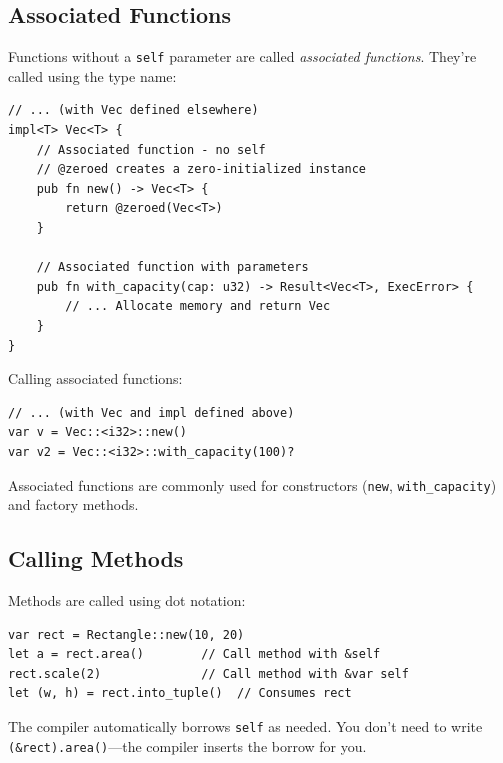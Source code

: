 \subsection{Associated Functions}
\label{subsec:associated-functions}

Functions without a \texttt{self} parameter are called \emph{associated functions}. They're called using the type name:

\begin{lstlisting}
// ... (with Vec defined elsewhere)
impl<T> Vec<T> {
    // Associated function - no self
    // @zeroed creates a zero-initialized instance
    pub fn new() -> Vec<T> {
        return @zeroed(Vec<T>)
    }

    // Associated function with parameters
    pub fn with_capacity(cap: u32) -> Result<Vec<T>, ExecError> {
        // ... Allocate memory and return Vec
    }
}
\end{lstlisting}

Calling associated functions:

\begin{lstlisting}
// ... (with Vec and impl defined above)
var v = Vec::<i32>::new()
var v2 = Vec::<i32>::with_capacity(100)?
\end{lstlisting}

Associated functions are commonly used for constructors (\texttt{new}, \texttt{with\_capacity}) and factory methods.

\subsection{Calling Methods}
\label{subsec:calling-methods}

Methods are called using dot notation:

\begin{lstlisting}
var rect = Rectangle::new(10, 20)
let a = rect.area()        // Call method with &self
rect.scale(2)              // Call method with &var self
let (w, h) = rect.into_tuple()  // Consumes rect
\end{lstlisting}

The compiler automatically borrows \texttt{self} as needed. You don't need to write \texttt{(\&rect).area()}---the compiler inserts the borrow for you.

